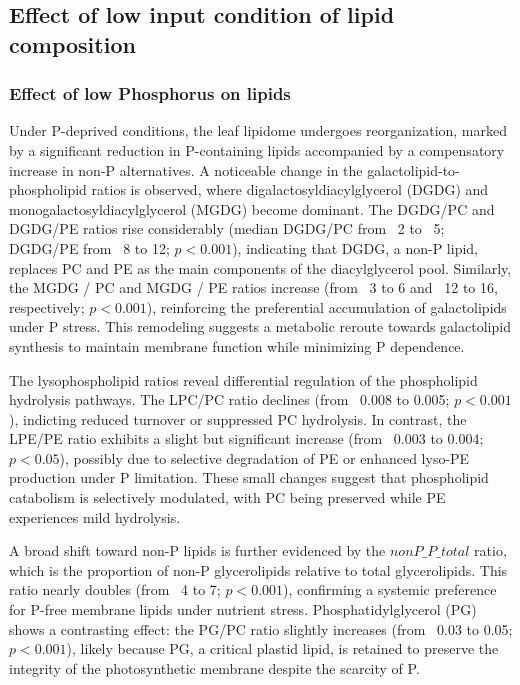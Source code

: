 \documentclass[10pt,letterpaper]{article}
\begin{document}
\subsection*{Effect of low input condition of lipid composition}
\subsubsection*{Effect of low Phosphorus on lipids}

Under P-deprived conditions, the leaf lipidome undergoes reorganization, marked by a significant reduction in P-containing lipids accompanied by a compensatory increase in non-P alternatives. A noticeable change in the galactolipid-to-phospholipid ratios is observed, where digalactosyldiacylglycerol (DGDG) and monogalactosyldiacylglycerol (MGDG) become dominant. The DGDG/PC and DGDG/PE ratios rise considerably (median DGDG/PC from ~2 to ~5; DGDG/PE from ~8 to 12; $p < 0.001$), indicating that DGDG, a non-P lipid, replaces PC and PE as the main components of the diacylglycerol pool. Similarly, the MGDG / PC and MGDG / PE ratios increase (from ~3 to 6 and ~12 to 16, respectively; $p < 0.001$), reinforcing the preferential accumulation of galactolipids under P stress. This remodeling suggests a metabolic reroute towards galactolipid synthesis to maintain membrane function while minimizing P dependence.

The lysophospholipid ratios reveal differential regulation of the phospholipid hydrolysis pathways. The LPC/PC ratio declines (from ~0.008 to 0.005; $p < 0.001$), indicting reduced turnover or suppressed PC hydrolysis. In contrast, the LPE/PE ratio exhibits a slight but significant increase (from ~0.003 to 0.004; $p < 0.05$), possibly due to selective degradation of PE or enhanced lyso-PE production under P limitation. These small changes suggest that phospholipid catabolism is selectively modulated, with PC being preserved while PE experiences mild hydrolysis.

A broad shift toward non-P lipids is further evidenced by the $nonP\_P\_total$ ratio, which is the proportion of non-P glycerolipids relative to total glycerolipids. This ratio nearly doubles (from ~4 to 7; $p < 0.001$), confirming a systemic preference for P-free membrane lipids under nutrient stress. Phosphatidylglycerol (PG) shows a contrasting effect: the PG/PC ratio slightly increases (from ~0.03 to 0.05; $p < 0.001$), likely because PG, a critical plastid lipid, is retained to preserve the integrity of the photosynthetic membrane despite the scarcity of P.
\end{document}
